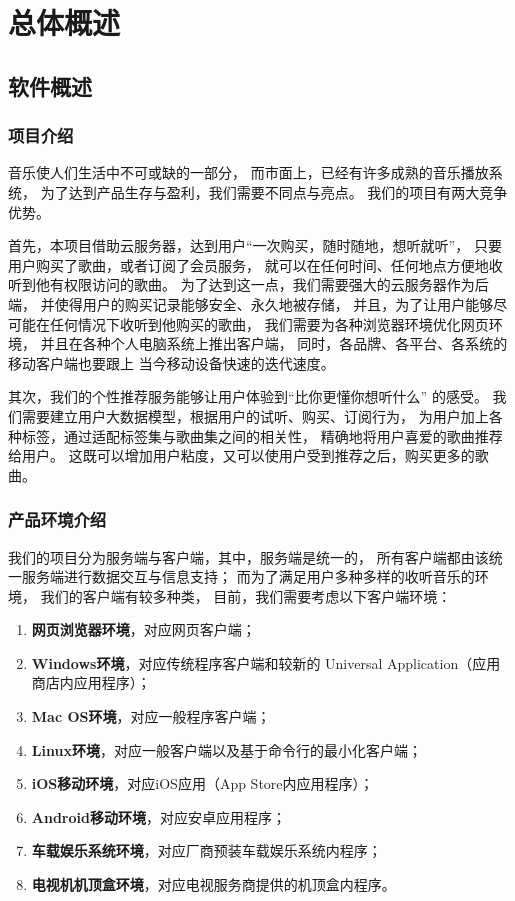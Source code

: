 \chapter{总体概述}

\section{软件概述}
\subsection{项目介绍}

音乐使人们生活中不可或缺的一部分，
    而市面上，已经有许多成熟的音乐播放系统，
    为了达到产品生存与盈利，我们需要不同点与亮点。
我们的\proname 项目有两大竞争优势。

首先，本项目借助云服务器，达到用户“一次购买，随时随地，想听就听”，
    只要用户购买了歌曲，或者订阅了会员服务，
    就可以在任何时间、任何地点方便地收听到他有权限访问的歌曲。
为了达到这一点，我们需要强大的云服务器作为后端，
    并使得用户的购买记录能够安全、永久地被存储，
    并且，为了让用户能够尽可能在任何情况下收听到他购买的歌曲，
    我们需要为各种浏览器环境优化网页环境，
    并且在各种个人电脑系统上推出客户端，
    同时，各品牌、各平台、各系统的移动客户端也要跟上
    当今移动设备快速的迭代速度。

其次，我们的个性推荐服务能够让用户体验到“\proname 比你更懂你想听什么”
    的感受。
    我们需要建立用户大数据模型，根据用户的试听、购买、订阅行为，
    为用户加上各种标签，通过适配标签集与歌曲集之间的相关性，
    精确地将用户喜爱的歌曲推荐给用户。
这既可以增加用户粘度，又可以使用户受到推荐之后，购买更多的歌曲。

\subsection{产品环境介绍}

我们的项目分为服务端与客户端，其中，服务端是统一的，
    所有客户端都由该统一服务端进行数据交互与信息支持；
    而为了满足用户多种多样的收听音乐的环境，
    我们的客户端有较多种类，
    目前，我们需要考虑以下客户端环境：
    \begin{enumerate}
        \item \textbf{网页浏览器环境}，对应网页客户端；
        \item \textbf{Windows环境}，对应传统程序客户端和较新的
        Universal Application（应用商店内应用程序）；
        \item \textbf{Mac OS环境}，对应一般程序客户端；
        \item \textbf{Linux环境}，对应一般客户端以及基于命令行的最小化客户端；
        \item \textbf{iOS移动环境}，对应iOS应用（App Store内应用程序）；
        \item \textbf{Android移动环境}，对应安卓应用程序；
        \item \textbf{车载娱乐系统环境}，对应厂商预装车载娱乐系统内程序；
        \item \textbf{电视机机顶盒环境}，对应电视服务商提供的机顶盒内程序。
    \end{enumerate}

